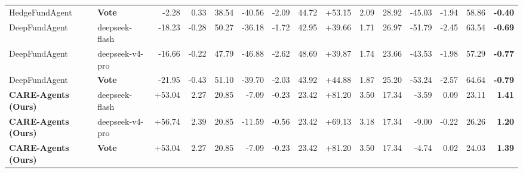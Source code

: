 \begin{table}[t]
{\begin{tabular}{llrrrrrrrrrrrrr}
HedgeFundAgent & \textbf{Vote} & -2.28 & 0.33 & 38.54 & -40.56 & -2.09 & 44.72 & +53.15 & 2.09 & 28.92 & -45.03 & -1.94 & 58.86 & \textbf{-0.40} \\
DeepFundAgent & deepseek-flash & -18.23 & -0.28 & 50.27 & -36.18 & -1.72 & 42.95 & +39.66 & 1.71 & 26.97 & -51.79 & -2.45 & 63.54 & \textbf{-0.69} \\
DeepFundAgent & deepseek-v4-pro & -16.66 & -0.22 & 47.79 & -46.88 & -2.62 & 48.69 & +39.87 & 1.74 & 23.66 & -43.53 & -1.98 & 57.29 & \textbf{-0.77} \\
DeepFundAgent & \textbf{Vote} & -21.95 & -0.43 & 51.10 & -39.70 & -2.03 & 43.92 & +44.88 & 1.87 & 25.20 & -53.24 & -2.57 & 64.64 & \textbf{-0.79} \\
\textbf{CARE-Agents (Ours)} & deepseek-flash & +53.04 & 2.27 & 20.85 & -7.09 & -0.23 & 23.42 & +81.20 & 3.50 & 17.34 & -3.59 & 0.09 & 23.11 & \textbf{1.41} \\
\textbf{CARE-Agents (Ours)} & deepseek-v4-pro & +56.74 & 2.39 & 20.85 & -11.59 & -0.56 & 23.42 & +69.13 & 3.18 & 17.34 & -9.00 & -0.22 & 26.26 & \textbf{1.20} \\
\textbf{CARE-Agents (Ours)} & \textbf{Vote} & +53.04 & 2.27 & 20.85 & -7.09 & -0.23 & 23.42 & +81.20 & 3.50 & 17.34 & -4.74 & 0.02 & 24.03 & \textbf{1.39} \\
\bottomrule
\end{tabular}%
}
\end{table}
